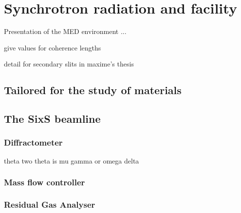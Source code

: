 \section{Synchrotron radiation and facility} \label{sec:SIXS}

Presentation of the MED environment ... 

give values for coherence lengths

detail for secondary slits in maxime's thesis

\subsection{Tailored for the study of materials}

\subsection{The SixS beamline}

\subsubsection{Diffractometer}
theta two theta is mu gamma or omega delta

\subsubsection{Mass flow controller}

\subsubsection{Residual Gas Analyser}


